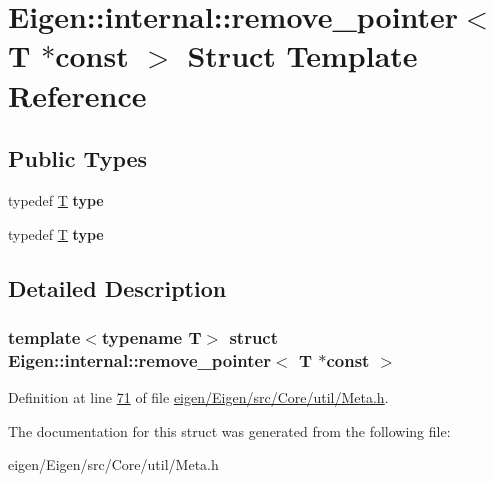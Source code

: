 \hypertarget{struct_eigen_1_1internal_1_1remove__pointer_3_01_t_01_5const_01_4}{}\section{Eigen\+:\+:internal\+:\+:remove\+\_\+pointer$<$ T $\ast$const $>$ Struct Template Reference}
\label{struct_eigen_1_1internal_1_1remove__pointer_3_01_t_01_5const_01_4}
\subsection*{Public Types}
\begin{DoxyCompactItemize}
\item 
\mbox{\label{struct_eigen_1_1internal_1_1remove__pointer_3_01_t_01_5const_01_4_ac2307323104253824b1c08e4970a24e7}} 
typedef \hyperlink{group___sparse_core___module}{T} {\bfseries type}
\item 
\mbox{\label{struct_eigen_1_1internal_1_1remove__pointer_3_01_t_01_5const_01_4_ac2307323104253824b1c08e4970a24e7}} 
typedef \hyperlink{group___sparse_core___module}{T} {\bfseries type}
\end{DoxyCompactItemize}


\subsection{Detailed Description}
\subsubsection*{template$<$typename T$>$\newline
struct Eigen\+::internal\+::remove\+\_\+pointer$<$ T $\ast$const $>$}



Definition at line \hyperlink{eigen_2_eigen_2src_2_core_2util_2_meta_8h_source_l00071}{71} of file \hyperlink{eigen_2_eigen_2src_2_core_2util_2_meta_8h_source}{eigen/\+Eigen/src/\+Core/util/\+Meta.\+h}.



The documentation for this struct was generated from the following file\+:\begin{DoxyCompactItemize}
\item 
eigen/\+Eigen/src/\+Core/util/\+Meta.\+h\end{DoxyCompactItemize}
